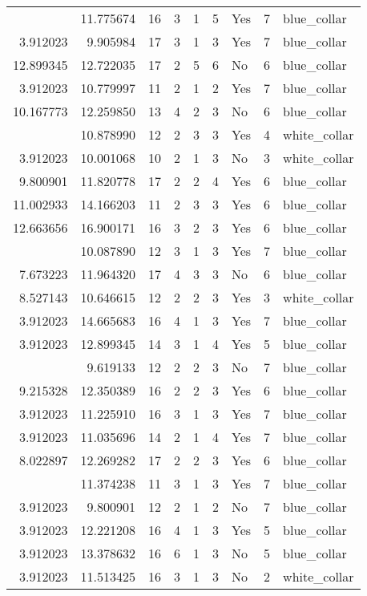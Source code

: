 \documentclass[
]{article}
\begin{document}
\begin{longtable}[t]{rrrrrllrl}
\addlinespace
3.912023 & 11.775674 & 16 & 3 & 1 & 5 & Yes & 7 & blue\_collar\\
3.912023 & 9.905984 & 17 & 3 & 1 & 3 & Yes & 7 & blue\_collar\\
12.899345 & 12.722035 & 17 & 2 & 5 & 6 & No & 6 & blue\_collar\\
3.912023 & 10.779997 & 11 & 2 & 1 & 2 & Yes & 7 & blue\_collar\\
10.167773 & 12.259850 & 13 & 4 & 2 & 3 & No & 6 & blue\_collar\\
\addlinespace
6.856462 & 10.878990 & 12 & 2 & 3 & 3 & Yes & 4 & white\_collar\\
3.912023 & 10.001068 & 10 & 2 & 1 & 3 & No & 3 & white\_collar\\
9.800901 & 11.820778 & 17 & 2 & 2 & 4 & Yes & 6 & blue\_collar\\
11.002933 & 14.166203 & 11 & 2 & 3 & 3 & Yes & 6 & blue\_collar\\
12.663656 & 16.900171 & 16 & 3 & 2 & 3 & Yes & 6 & blue\_collar\\
\addlinespace
3.912023 & 10.087890 & 12 & 3 & 1 & 3 & Yes & 7 & blue\_collar\\
7.673223 & 11.964320 & 17 & 4 & 3 & 3 & No & 6 & blue\_collar\\
8.527143 & 10.646615 & 12 & 2 & 2 & 3 & Yes & 3 & white\_collar\\
3.912023 & 14.665683 & 16 & 4 & 1 & 3 & Yes & 7 & blue\_collar\\
3.912023 & 12.899345 & 14 & 3 & 1 & 4 & Yes & 5 & blue\_collar\\
\addlinespace
9.619133 & 9.619133 & 12 & 2 & 2 & 3 & No & 7 & blue\_collar\\
9.215328 & 12.350389 & 16 & 2 & 2 & 3 & Yes & 6 & blue\_collar\\
3.912023 & 11.225910 & 16 & 3 & 1 & 3 & Yes & 7 & blue\_collar\\
3.912023 & 11.035696 & 14 & 2 & 1 & 4 & Yes & 7 & blue\_collar\\
8.022897 & 12.269282 & 17 & 2 & 2 & 3 & Yes & 6 & blue\_collar\\
\addlinespace
3.912023 & 11.374238 & 11 & 3 & 1 & 3 & Yes & 7 & blue\_collar\\
3.912023 & 9.800901 & 12 & 2 & 1 & 2 & No & 7 & blue\_collar\\
3.912023 & 12.221208 & 16 & 4 & 1 & 3 & Yes & 5 & blue\_collar\\
3.912023 & 13.378632 & 16 & 6 & 1 & 3 & No & 5 & blue\_collar\\
3.912023 & 11.513425 & 16 & 3 & 1 & 3 & No & 2 & white\_collar\\

\end{longtable}
\end{document}
